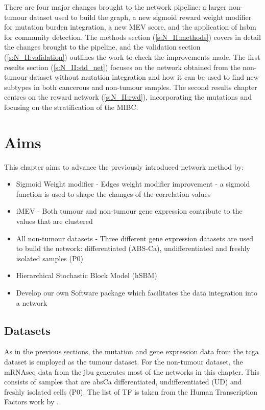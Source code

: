 There are four major changes brought to the network pipeline: a larger non-tumour dataset used to build the graph, a new sigmoid reward weight modifier for mutation burden integration, a new MEV score, and the application of \acrfull{hsbm} for community detection. The methods section (\ref{s:N_II:methods}) covers in detail the changes brought to the pipeline, and the validation section (\ref{s:N_II:validation}) outlines the work to check the improvements made. The first results section (\cref{s:N_II:std_net}) focuses on the network obtained from the non-tumour dataset without mutation integration and how it can be used to find new subtypes in both cancerous and non-tumour samples. The second results chapter centres on the reward network (\cref{s:N_II:rwd}), incorporating the mutations and focusing on the stratification of the MIBC.


\section{Aims}

This chapter aims to advance the previously introduced network method by:
\begin{itemize}
    \item Sigmoid Weight modifier - Edges weight modifier improvement - a sigmoid function is used to shape the changes of the correlation values
    \item iMEV - Both tumour and non-tumour gene expression contribute to the values that are clustered 
    \item All non-tumour datasets - Three different gene expression datasets are used to build the network: differentiated (ABS-Ca), undifferentiated and freshly isolated samples (P0)
    \item Hierarchical Stochastic Block Model (hSBM)
    \item Develop our own Software package which facilitates the data integration into a network
\end{itemize}

\subsection*{Datasets}

As in the previous sections, the mutation and gene expression data from the \acrshort{tcga} dataset is employed as the tumour dataset. For the non-tumour dataset, the mRNAseq data from the \acrfull{jbu} generates most of the networks in this chapter. This consists of samples that are \acrlong{absCa} differentiated, undifferentiated (UD) and freshly isolated cells (P0). The list of TF is taken from the Human Transcription Factors work by \citet{Lambert2018-el}.


